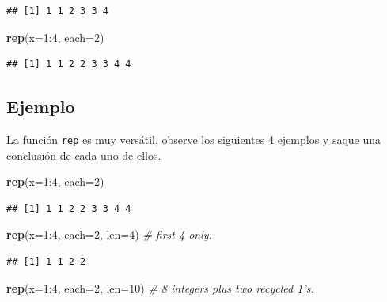 \documentclass[10pt,]{krantz}
\makeatletter
\newenvironment{Shaded}{\begin{snugshade}}{\end{snugshade}}
\newcommand{\KeywordTok}[1]{\textcolor[rgb]{0.13,0.29,0.53}{\textbf{{#1}}}}
\newcommand{\DataTypeTok}[1]{\textcolor[rgb]{0.13,0.29,0.53}{{#1}}}
\newcommand{\DecValTok}[1]{\textcolor[rgb]{0.00,0.00,0.81}{{#1}}}
\newcommand{\CommentTok}[1]{\textcolor[rgb]{0.56,0.35,0.01}{\textit{{#1}}}}
\newcommand{\NormalTok}[1]{{#1}}
\newenvironment{kframe}{%
\medskip{}
\setlength{\fboxsep}{.8em}
 \def\at@end@of@kframe{}%
 \ifinner\ifhmode%
  \def\at@end@of@kframe{\end{minipage}}%
  \begin{minipage}{\columnwidth}%
 \fi\fi%
 \def\FrameCommand##1{\hskip\@totalleftmargin \hskip-\fboxsep
 \colorbox{shadecolor}{##1}\hskip-\fboxsep
     \hskip-\linewidth \hskip-\@totalleftmargin \hskip\columnwidth}%
 \MakeFramed {\advance\hsize-\width
   \@totalleftmargin\z@ \linewidth\hsize
   \@setminipage}}%
 {\par\unskip\endMakeFramed%
 \at@end@of@kframe}
\renewenvironment{Shaded}{\begin{kframe}}{\end{kframe}}
\makeatother
\begin{document}
\begin{verbatim}
## [1] 1 1 2 3 3 4
\end{verbatim}

\begin{Shaded}
\begin{Highlighting}[]
\KeywordTok{rep}\NormalTok{(}\DataTypeTok{x=}\DecValTok{1}\NormalTok{:}\DecValTok{4}\NormalTok{, }\DataTypeTok{each=}\DecValTok{2}\NormalTok{)}
\end{Highlighting}
\end{Shaded}

\begin{verbatim}
## [1] 1 1 2 2 3 3 4 4
\end{verbatim}

\subsection*{Ejemplo}\label{ejemplo-18}


La función \texttt{rep} es muy versátil, observe los siguientes 4
ejemplos y saque una conclusión de cada uno de ellos.

\begin{Shaded}
\begin{Highlighting}[]
\KeywordTok{rep}\NormalTok{(}\DataTypeTok{x=}\DecValTok{1}\NormalTok{:}\DecValTok{4}\NormalTok{, }\DataTypeTok{each=}\DecValTok{2}\NormalTok{)}
\end{Highlighting}
\end{Shaded}

\begin{verbatim}
## [1] 1 1 2 2 3 3 4 4
\end{verbatim}

\begin{Shaded}
\begin{Highlighting}[]
\KeywordTok{rep}\NormalTok{(}\DataTypeTok{x=}\DecValTok{1}\NormalTok{:}\DecValTok{4}\NormalTok{, }\DataTypeTok{each=}\DecValTok{2}\NormalTok{, }\DataTypeTok{len=}\DecValTok{4}\NormalTok{)    }\CommentTok{# first 4 only.}
\end{Highlighting}
\end{Shaded}

\begin{verbatim}
## [1] 1 1 2 2
\end{verbatim}

\begin{Shaded}
\begin{Highlighting}[]
\KeywordTok{rep}\NormalTok{(}\DataTypeTok{x=}\DecValTok{1}\NormalTok{:}\DecValTok{4}\NormalTok{, }\DataTypeTok{each=}\DecValTok{2}\NormalTok{, }\DataTypeTok{len=}\DecValTok{10}\NormalTok{)   }\CommentTok{# 8 integers plus two recycled 1's.}
\end{Highlighting}
\end{Shaded}
\end{document}
